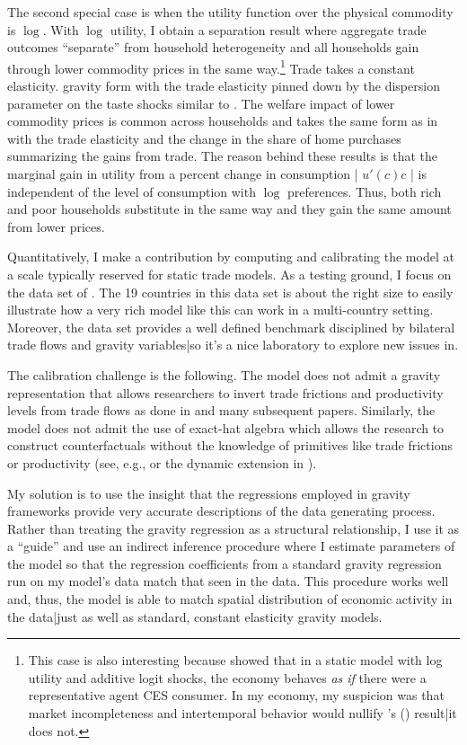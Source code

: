 \documentclass[12pt,pdftex]{article}
\def\citeapos#1{\citeauthor{#1}'s (\citeyear{#1})}
\begin{document}
\begin{onehalfspacing}
The second special case is when the utility function over the physical commodity is $\log$. With $\log$ utility, I obtain a separation result where aggregate trade outcomes ``separate'' from household heterogeneity and all households gain through lower commodity prices in the same way.\footnote{This case is also interesting because \citet*{anderson1987ces} showed that in a static model with log utility and additive logit shocks, the economy behaves \emph{as if} there were a representative agent CES consumer. In my economy, my suspicion was that market incompleteness and intertemporal behavior would nullify \citeapos{anderson1987ces} result|it does not.} Trade takes a constant elasticity. gravity form with the trade elasticity pinned down by the dispersion parameter on the taste shocks similar to \citet{eaton2002technology}. The welfare impact of lower commodity prices is common across households and takes the same form as in \citet{arkolakis2012new} with the trade elasticity and the change in the share of home purchases summarizing the gains from trade. The reason behind these results is that the marginal gain in utility from a percent change in consumption | $u'(c)c$ | is independent of the level of consumption with $\log$ preferences. Thus, both rich and poor households substitute in the same way and they gain the same amount from lower prices.

Quantitatively, I make a contribution by computing and calibrating the model at a scale typically reserved for static trade models. As a testing ground, I focus on the data set of \citet{eaton2002technology}. The 19 countries in this data set is about the right size to easily illustrate how a very rich model like this can work in a multi-country setting. Moreover, the \citet{eaton2002technology} data set provides a well defined benchmark disciplined by bilateral trade flows and gravity variables|so it's a nice laboratory to explore new issues in.

The calibration challenge is the following. The model does not admit a gravity representation that allows researchers to invert trade frictions and productivity levels from trade flows as done in \citet{eaton2002technology} and many subsequent papers. Similarly, the model does not admit the use of exact-hat algebra which allows the research to construct counterfactuals without the knowledge of primitives like trade frictions or productivity (see, e.g., \citet{costinot2014trade} or the dynamic extension in \citet*{caliendo2015trade}).

My solution is to use the insight that the regressions employed in gravity frameworks provide very accurate descriptions of the data generating process. Rather than treating the gravity regression as a structural relationship, I use it as a ``guide'' and use an indirect inference procedure where I estimate parameters of the model so that the regression coefficients from a standard gravity regression run on my model's data match that seen in the data. This procedure works well and, thus, the model is able to match spatial distribution of economic activity in the data|just as well as standard, constant elasticity gravity models.


\end{onehalfspacing}
\end{document}
